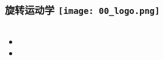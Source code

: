
\begin{frame}
  \frametitle{旋转运动学 \hfill \texttt{[image: 00\_logo.png]}}
  \begin{columns}

    \begin{itemize}
      \item 
      \item 
      
    \end{itemize}
    
  \end{columns}
  \end{frame}
  
  
  
  